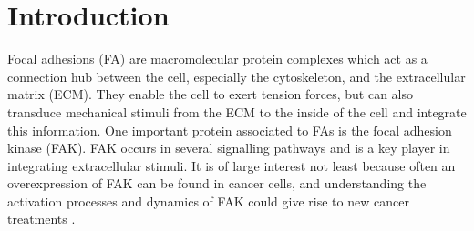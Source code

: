 \chapter{Introduction}
Focal adhesions (FA) are macromolecular protein complexes which act as a connection hub between the cell, especially the cytoskeleton, and the extracellular matrix (ECM). They enable the cell to exert tension forces, but can also transduce mechanical stimuli from the ECM to the inside of the cell and integrate this information. One important protein associated to FAs is the focal adhesion kinase (FAK). FAK occurs in several signalling pathways and is a key player in integrating extracellular stimuli. It is of large interest not least because often an overexpression of FAK can be found in cancer cells, and understanding the activation processes and dynamics of FAK could give rise to new cancer treatments \autocite{cancerFAK}.
